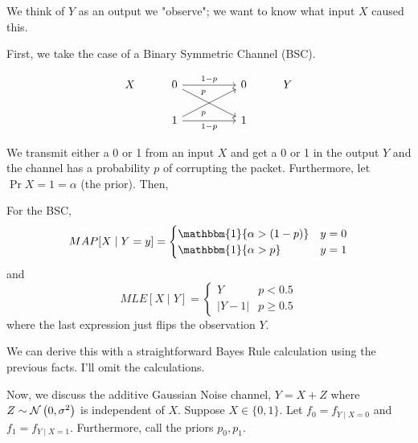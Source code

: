 We think of $Y$ as an output we "observe"; we want to know what input $X$ caused this.

First, we take the case of a Binary Symmetric Channel (BSC).

\[\begin{tikzcd}
	X & 0 && 0 & Y \\
	& 1 && 1
	\arrow["{1-p}", from=1-2, to=1-4]
	\arrow["p"'{pos=0.3}, from=2-2, to=1-4]
	\arrow["p"{pos=0.3}, from=1-2, to=2-4]
	\arrow["{1-p}"', from=2-2, to=2-4]
\end{tikzcd}\]

We transmit either a 0 or 1 from an input $X$
and get a 0 or 1 in the output $Y$ and the channel has a probability $p$ of corrupting the packet.
Furthermore, let $\Pr{X = 1} = \alpha$ (the prior). Then,

\begin{theorem}
    For the BSC,
    \[ MAP[X \mid Y = y] = \begin{cases}
        \mathbbm{1}\{\alpha > (1 - p)\} & y = 0 \\
        \mathbbm{1}\{\alpha > p\} & y = 1 \\
    \end{cases} \]
    and
    \[ MLE[X \mid Y] = \begin{cases}
        Y & p < 0.5 \\
        |Y - 1| & p \geq 0.5
    \end{cases} \]
    where the last expression just flips the observation $Y$.

    We can derive this with a straightforward Bayes Rule calculation using the previous facts. I'll omit the calculations.
\end{theorem}

Now, we discuss the additive Gaussian Noise channel, $Y = X + Z$ where $Z \sim \mathcal{N}\left( 0, \sigma^2 \right)$ is independent of $X$.
Suppose $X \in \{0, 1\}$. Let $f_0 = f_{Y \mid X = 0}$ and $f_1 = f_{Y \mid X = 1}$. Furthermore, call the priors $p_0, p_1$.


